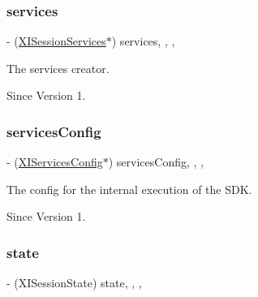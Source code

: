 \subsubsection{\texorpdfstring{services}{services}}
{\footnotesize\ttfamily -\/ (\hyperlink{interface_x_i_session_services}{X\+I\+Session\+Services}$\ast$) services\hspace{0.3cm}{\ttfamily [read]}, {\ttfamily [write]}, {\ttfamily [nonatomic]}, {\ttfamily [strong]}}



The services creator. 

\begin{DoxySince}{Since}
Version 1. 
\end{DoxySince}
\hypertarget{category_x_i_session_internal_07_08_acaf7c1e7cac39e0c0937b1ebd13c326c}{}\label{category_x_i_session_internal_07_08_acaf7c1e7cac39e0c0937b1ebd13c326c} 
\subsubsection{\texorpdfstring{services\+Config}{servicesConfig}}
{\footnotesize\ttfamily -\/ (\hyperlink{interface_x_i_services_config}{X\+I\+Services\+Config}$\ast$) services\+Config\hspace{0.3cm}{\ttfamily [read]}, {\ttfamily [write]}, {\ttfamily [nonatomic]}, {\ttfamily [strong]}}



The config for the internal execution of the S\+DK. 

\begin{DoxySince}{Since}
Version 1. 
\end{DoxySince}
\hypertarget{category_x_i_session_internal_07_08_a6d9c9e5903ac3ee10b6729e3e74f834f}{}\label{category_x_i_session_internal_07_08_a6d9c9e5903ac3ee10b6729e3e74f834f} 
\subsubsection{\texorpdfstring{state}{state}}
{\footnotesize\ttfamily -\/ (X\+I\+Session\+State) state\hspace{0.3cm}{\ttfamily [read]}, {\ttfamily [write]}, {\ttfamily [nonatomic]}, {\ttfamily [assign]}}



